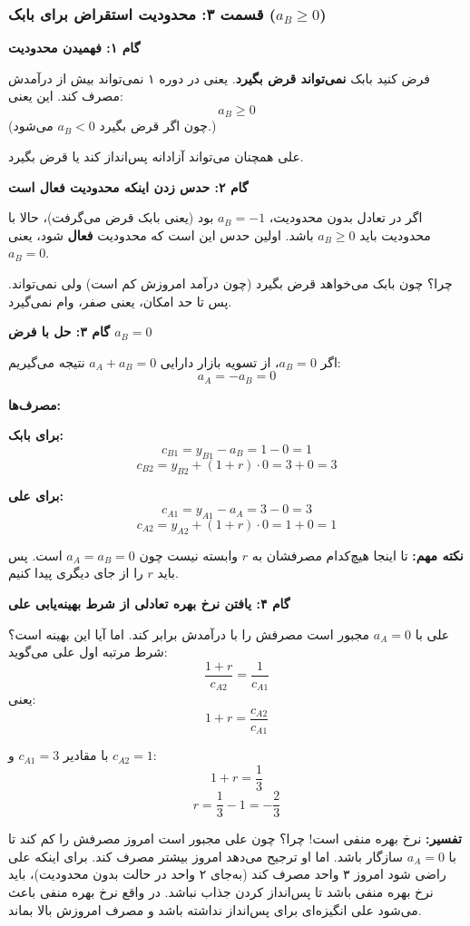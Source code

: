 \documentclass[12pt,a4paper]{article}
\begin{document}
\subsubsection{قسمت ۳: محدودیت استقراض برای بابک ($a_B \geq 0$)}

\textbf{گام ۱: فهمیدن محدودیت}

فرض کنید بابک \textbf{نمی‌تواند قرض بگیرد}. یعنی در دوره ۱ نمی‌تواند بیش از درآمدش مصرف کند. این یعنی:
\[
	a_B \geq 0
\]
(چون اگر قرض بگیرد $a_B < 0$ می‌شود.)

علی همچنان می‌تواند آزادانه پس‌انداز کند یا قرض بگیرد.

\textbf{گام ۲: حدس زدن اینکه محدودیت فعال است}

اگر در تعادل بدون محدودیت، $a_B = -1$ بود (یعنی بابک قرض می‌گرفت)، حالا با محدودیت باید $a_B \geq 0$ باشد. اولین حدس این است که محدودیت \textbf{فعال} شود، یعنی $a_B = 0$.

چرا؟ چون بابک می‌خواهد قرض بگیرد (چون درآمد امروزش کم است) ولی نمی‌تواند. پس تا حد امکان، یعنی صفر، وام نمی‌گیرد.

\textbf{گام ۳: حل با فرض $a_B = 0$}

اگر $a_B = 0$، از تسویه بازار دارایی $a_A + a_B = 0$ نتیجه می‌گیریم:
\[
	a_A = -a_B = 0
\]

\textbf{مصرف‌ها:}

\textbf{برای بابک:}
\[
	c_{B1} = y_{B1} - a_B = 1 - 0 = 1
\]
\[
	c_{B2} = y_{B2} + (1+r) \cdot 0 = 3 + 0 = 3
\]

\textbf{برای علی:}
\[
	c_{A1} = y_{A1} - a_A = 3 - 0 = 3
\]
\[
	c_{A2} = y_{A2} + (1+r) \cdot 0 = 1 + 0 = 1
\]

\textbf{نکته مهم:} تا اینجا هیچ‌کدام مصرفشان به $r$ وابسته نیست چون $a_A = a_B = 0$ است. پس باید $r$ را از جای دیگری پیدا کنیم.

\textbf{گام ۴: یافتن نرخ بهره تعادلی از شرط بهینه‌یابی علی}

علی با $a_A = 0$ مجبور است مصرفش را با درآمدش برابر کند. اما آیا این بهینه است؟ شرط مرتبه اول علی می‌گوید:
\[
	\frac{1+r}{c_{A2}} = \frac{1}{c_{A1}}
\]
یعنی:
\[
	1+r = \frac{c_{A2}}{c_{A1}}
\]

با مقادیر $c_{A1} = 3$ و $c_{A2} = 1$:
\[
	1+r = \frac{1}{3}
\]
\[
	\boxed{r = \frac{1}{3} - 1 = -\frac{2}{3}}
\]

\textbf{تفسیر:} نرخ بهره منفی است! چرا؟ چون علی مجبور است امروز مصرفش را کم کند تا با $a_A = 0$ سازگار باشد. اما او ترجیح می‌دهد امروز بیشتر مصرف کند. برای اینکه علی راضی شود امروز ۳ واحد مصرف کند (به‌جای ۲ واحد در حالت بدون محدودیت)، باید نرخ بهره منفی باشد تا پس‌انداز کردن جذاب نباشد. در واقع نرخ بهره منفی باعث می‌شود علی انگیزه‌ای برای پس‌انداز نداشته باشد و مصرف امروزش بالا بماند.
\end{document}
